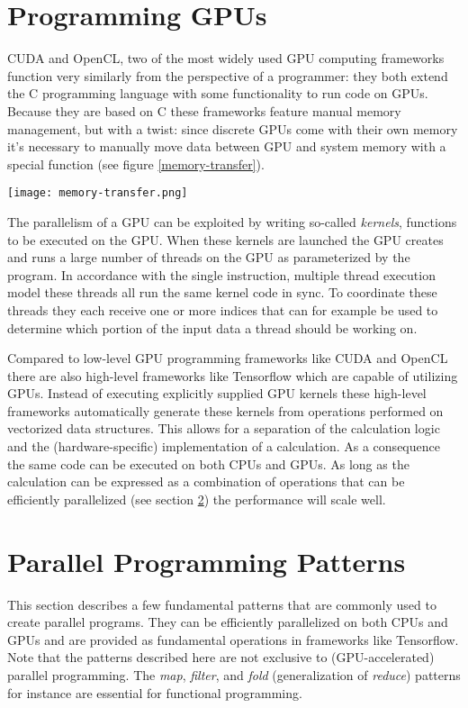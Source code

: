 \section{Programming GPUs}
\label{sec:programming}
CUDA\cite{cuda} and OpenCL\cite{opencl}, two of the most widely used GPU computing frameworks function very similarly from the perspective of a programmer:
they both extend the C programming language\cite{c} with some functionality to run code on GPUs.
Because they are based on C these frameworks feature manual memory management, but with a twist:
since discrete GPUs come with their own memory it's necessary to manually move data between
GPU and system memory with a special function (see figure \ref{memory-transfer}).
\begin{figure*}
	\texttt{[image: memory-transfer.png]}
	\caption{
		Graphical representation of the transfer of data between memory accessible by the CPU (system memory)
		and the GPU (frame buffer).
		The data is transferred with a special function
		(CUDA's cudaMemcpy in this case, other frameworks have equivalent functions).
	}
	\label{memory-transfer}
\end{figure*}

The parallelism of a GPU can be exploited by writing so-called \textit{kernels}, functions to be executed on the GPU.
When these kernels are launched the GPU creates and runs a large number of threads on the GPU as parameterized by the program.
In accordance with the single instruction, multiple thread execution model these threads all run the same kernel code in sync.
To coordinate these threads they each receive one or more indices that can for example
be used to determine which portion of the input data a thread should be working on.

Compared to low-level GPU programming frameworks like CUDA and OpenCL there are also high-level frameworks like
Tensorflow\cite{tensorflow} which are capable of utilizing GPUs.
Instead of executing explicitly supplied GPU kernels these high-level frameworks automatically generate these kernels from
operations performed on vectorized data structures.
This allows for a separation of the calculation logic and the (hardware-specific) implementation of a calculation.
As a consequence the same code can be executed on both CPUs and GPUs.
As long as the calculation can be expressed as a combination of operations that can be efficiently parallelized
(see section \ref{sec:ppp}) the performance will scale well.
\section{Parallel Programming Patterns}
\label{sec:ppp}
This section describes a few fundamental patterns that are commonly used to create parallel programs.
They can be efficiently parallelized on both CPUs and GPUs and are provided as fundamental operations in frameworks like Tensorflow.
Note that the patterns described here are not exclusive to (GPU-accelerated) parallel programming.
The \textit{map}, \textit{filter}, and \textit{fold} (generalization of \textit{reduce}) patterns for instance are essential for functional programming.

